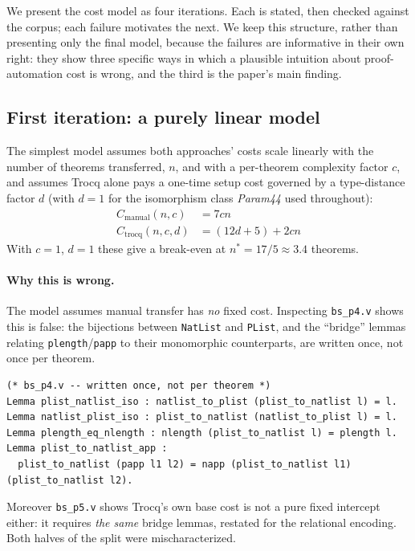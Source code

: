 \documentclass[runningheads]{llncs}
\begin{document}
We present the cost model as four iterations. Each is stated, then checked
against the corpus; each failure motivates the next. We keep this structure,
rather than presenting only the final model, because the failures are
informative in their own right: they show three specific ways in which a
plausible intuition about proof-automation cost is wrong, and the third is
the paper's main finding.

\subsection{First iteration: a purely linear model}
\label{sec:first}

The simplest model assumes both approaches' costs scale linearly with the
number of theorems transferred, $n$, and with a per-theorem complexity factor
$c$, and assumes Trocq alone pays a one-time setup cost governed by a
type-distance factor $d$ (with $d=1$ for the isomorphism class \emph{Param44}
used throughout):
\begin{align}
C_{\text{manual}}(n,c) &= 7cn \\
C_{\text{trocq}}(n,c,d) &= (12d+5) + 2cn
\end{align}
With $c=1$, $d=1$ these give a break-even at $n^{*}=17/5\approx 3.4$
theorems.

\paragraph{Why this is wrong.} The model assumes manual transfer has
\emph{no} fixed cost. Inspecting \texttt{bs\_p4.v} shows this is false: the
bijections between \texttt{NatList} and \texttt{PList}, and the ``bridge''
lemmas relating \texttt{plength}/\texttt{papp} to their monomorphic
counterparts, are written once, not once per theorem.

\begin{lstlisting}
(* bs_p4.v -- written once, not per theorem *)
Lemma plist_natlist_iso : natlist_to_plist (plist_to_natlist l) = l.
Lemma natlist_plist_iso : plist_to_natlist (natlist_to_plist l) = l.
Lemma plength_eq_nlength : nlength (plist_to_natlist l) = plength l.
Lemma plist_to_natlist_app :
  plist_to_natlist (papp l1 l2) = napp (plist_to_natlist l1) (plist_to_natlist l2).
\end{lstlisting}

Moreover \texttt{bs\_p5.v} shows Trocq's own base cost is not a pure fixed
intercept either: it requires \emph{the same} bridge lemmas, restated for the
relational encoding. Both halves of the split were mischaracterized.
\end{document}
